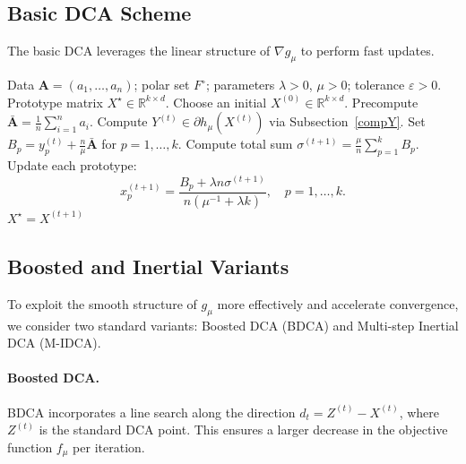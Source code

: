 \documentclass[11pt]{article}
\theoremstyle{definition}
\newcommand{\1}{\mathbf{1}}
\begin{document}
\subsection{Basic DCA Scheme}

The basic DCA leverages the linear structure of $\nabla g_\mu$ to perform fast updates.

\begin{algorithm}[htbp]
\caption{DCA for the smoothed Minkowski clustering model}
\label{alg:DCA}
\begin{algorithmic}[1]
\Require Data $\mathbf{A}=(a_1,\dots,a_n)$; polar set $F^\circ$; parameters $\lambda>0$, $\mu>0$; tolerance $\varepsilon>0$.
\Ensure Prototype matrix $X^\star \in \mathbb{R}^{k \times d}$.
\State Choose an initial $X^{(0)} \in \mathbb{R}^{k \times d}$.
\State Precompute $\bar{\mathbf{A}} = \frac{1}{n} \sum_{i=1}^n a_i$.
    \State Compute $Y^{(t)} \in \partial h_\mu(X^{(t)})$ via Subsection~\ref{compY}.
    \State Set $B_p = y_p^{(t)} + \frac{n}{\mu} \bar{\mathbf{A}}$ for $p=1,\dots,k$.
    \State Compute total sum $\sigma^{(t+1)} = \frac{\mu}{n} \sum_{p=1}^k B_p$.
    \State Update each prototype: 
    \[ x_p^{(t+1)} = \frac{B_p + \lambda n \sigma^{(t+1)}}{n(\mu^{-1} + \lambda k)}, \quad p=1,\dots,k. \]
        \State \Return $X^\star = X^{(t+1)}$
    \EndIf
\EndFor
\end{algorithmic}
\end{algorithm}


\subsection{Boosted and Inertial Variants}

To exploit the smooth structure of $g_\mu$ more effectively and accelerate convergence, we consider two standard variants: Boosted DCA (BDCA) and Multi-step Inertial DCA (M-IDCA).

\paragraph{Boosted DCA.}
BDCA incorporates a line search along the direction $d_t = Z^{(t)} - X^{(t)}$, where $Z^{(t)}$ is the standard DCA point. This ensures a larger decrease in the objective function $f_\mu$ per iteration.
\end{document}
